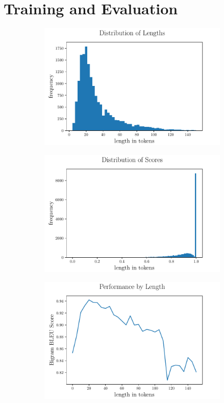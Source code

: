 \documentclass[12pt]{article}
\begin{document}
\section{Training and Evaluation}

\begin{figure}[h]
  \begin{subfigure}{0.5\textwidth}
		\includegraphics[scale=.425]{histogram.pdf}
		\centering
		\caption{}
	\end{subfigure}
	\begin{subfigure}{0.5\textwidth}
		\includegraphics[scale=.425]{scorehistogram.pdf}
		\centering
		\caption{}
	\end{subfigure}
  \begin{subfigure}{1.0\textwidth}
		\centering
		\includegraphics[scale=.425]{scorebylen.pdf}

\end{subfigure}
\end{figure}
\end{document}

